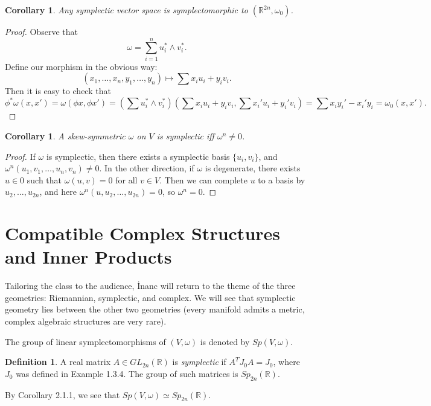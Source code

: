 \documentclass[leqno, openany]{memoir}
\newtheorem{cor}[thm]{Corollary}
\theoremstyle{definition}
\newtheorem{defn}[thm]{Definition}
\theoremstyle{remark}
\theoremstyle{plain}
\theoremstyle{definition}
\theoremstyle{remark}
\newcommand{\R}{\mathbb{R}}
\begin{document}
\begin{cor} Any symplectic vector space is symplectomorphic to $(\R^{2n},
\omega_0)$.  \end{cor}

\begin{proof} Observe that \[ \omega = \sum_{i=1}^n u_i^* \wedge v_i^*. \]
Define our morphism in the obvious way: \[ (x_1, \ldots, x_n, y_1, \ldots, y_n)
    \mapsto \sum x_i u_i + y_i v_i.\] Then it is easy to check that \[ \phi^*
\omega (x,x') = \omega(\phi x, \phi x') = \left( \sum u_i^* \wedge v_i^*
\right) \left( \sum x_i u_i + y_i v_i, \sum x_i' u_i + y_i' v_i \right) = \sum
x_i y_i' - x_i' y_i = \omega_0(x,x').\] \end{proof}

\begin{cor} A skew-symmetric $\omega$ on $V$ is symplectic iff $\omega^n \neq
0$.  \end{cor}

\begin{proof} If $\omega$ is symplectic, then there exists a symplectic basis
    $\{ u_i, v_i \}$, and $\omega^n(u_1, v_1, \ldots, u_n, v_n) \neq 0$. In the
    other direction, if $\omega$ is degenerate, there exists $u \in 0$ such
    that $\omega(u,v) = 0$ for all $v \in V$. Then we can complete $u$ to a
    basis by $u_2, \ldots, u_{2n}$, and here $\omega^n(u, u_2, \ldots, u_{2n})
    = 0$, so $\omega^n = 0$.  \end{proof}

\section{Compatible Complex Structures and Inner Products}%
\label{sec:compatible_complex_structures_and_inner_products}

Tailoring the class to the audience, \.Inanc will return to the theme of the
three geometries: Riemannian, symplectic, and complex. We will see that
symplectic geometry lies between the other two geometries (every manifold
admits a metric, complex algebraic structures are very rare).

The group of linear symplectomorphisms of $(V, \omega)$ is denoted by $Sp(V,
\omega)$.  \begin{defn} A real matrix $A \in GL_{2n}(\R)$ is
    \textit{symplectic} if $A^T J_0 A = J_0$, where $J_0$ was defined in
    Example 1.3.4. The group of such matrices is $Sp_{2n}(\R)$.  \end{defn}

By Corollary 2.1.1, we see that $Sp(V, \omega) \simeq Sp_{2n}(\R)$.
\end{document}
